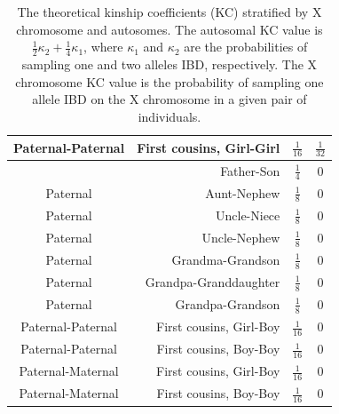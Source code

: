 \documentclass[11pt]{article} %
\begin{document}
\begin{table}[ht]
\begin{tabular}{crcc}
Paternal-Paternal & First cousins, Girl-Girl & $\frac{1}{16}$ & $\frac{1}{32}$\\ \hline

&Father-Son &$\frac{1}{4}$&0\\
Paternal&Aunt-Nephew&$\frac{1}{8}$&0\\
Paternal&Uncle-Niece &$\frac{1}{8}$&0\\
Paternal&Uncle-Nephew &$\frac{1}{8}$&0\\
Paternal&Grandma-Grandson &$\frac{1}{8}$&0\\
Paternal&Grandpa-Granddaughter&$\frac{1}{8}$&0\\
Paternal&Grandpa-Grandson &$\frac{1}{8}$&0\\
Paternal-Paternal & First cousins, Girl-Boy & $\frac{1}{16}$ & 0\\
Paternal-Paternal & First cousins, Boy-Boy & $\frac{1}{16}$ & 0\\
Paternal-Maternal& First cousins, Girl-Boy & $\frac{1}{16}$ & 0\\
Paternal-Maternal& First cousins, Boy-Boy & $\frac{1}{16}$ & 0\\
\hline
\end{tabular}
\caption{The theoretical kinship coefficients (KC) stratified by X chromosome and autosomes. The autosomal KC value is $\frac{1}{2}\kappa_2+\frac{1}{4}\kappa_1$, where $\kappa_1$ and $\kappa_2$ are the probabilities of sampling one and two alleles IBD, respectively. The X chromosome KC value is the probability of sampling one allele IBD on the X chromosome in a given pair of individuals.}
\label{kc_auto_x_groupedByValue}
\end{table}
\end{document}

